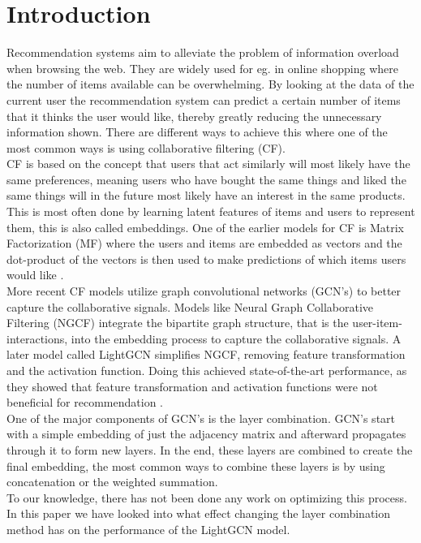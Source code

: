 \section{Introduction}

Recommendation systems aim to alleviate the problem of information overload when browsing the web.
They are widely used for eg. in online shopping where the number of items available can be overwhelming.
By looking at the data of the current user the recommendation system can predict a certain number of items that it thinks the user would like, thereby greatly reducing the unnecessary information shown.
There are different ways to achieve this where one of the most common ways is using collaborative filtering (CF).
\\
CF is based on the concept that users that act similarly will most likely have the same preferences, meaning users who have bought the same things and liked the same things will in the future most likely have an interest in the same products.
This is most often done by learning latent features of items and users to represent them, this is also called embeddings.
One of the earlier models for CF is Matrix Factorization (MF) where the users and items are embedded as vectors and the dot-product of the vectors is then used to make predictions of which items users would like \cite{Matrix-factorization-techniques}.
\\
More recent CF models utilize graph convolutional networks (GCN's) to better capture the collaborative signals.
Models like Neural Graph Collaborative Filtering (NGCF) integrate the bipartite graph structure, that is the user-item-interactions, into the embedding process to capture the collaborative signals\cite{NGCF_2019}.
A later model called LightGCN simplifies NGCF, removing feature transformation and the activation function.
Doing this achieved state-of-the-art performance, as they showed that feature transformation and activation functions were not beneficial for recommendation \cite{lightgcn}.
\\
One of the major components of GCN's is the layer combination.
GCN's start with a simple embedding of just the adjacency matrix and afterward propagates through it to form new layers.
In the end, these layers are combined to create the final embedding, the most common ways to combine these layers is by using concatenation or the weighted summation.
\\
To our knowledge, there has not been done any work on optimizing this process.
In this paper we have looked into what effect changing the layer combination method has on the performance of the LightGCN model.
